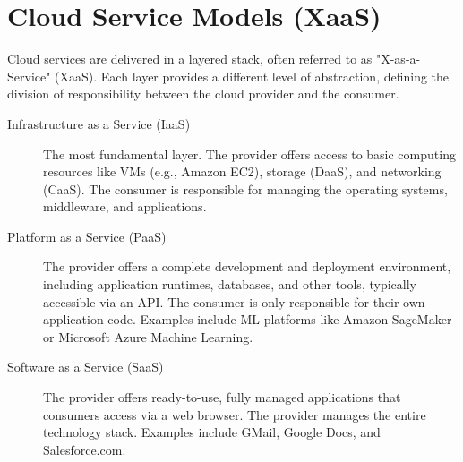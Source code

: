 \section{Cloud Service Models (XaaS)}
Cloud services are delivered in a layered stack, often referred to as "X-as-a-Service" (XaaS). Each layer provides a different level of abstraction, defining the division of responsibility between the cloud provider and the consumer.


\begin{description}
    \item[Infrastructure as a Service (IaaS)] The most fundamental layer. The provider offers access to basic computing resources like VMs (e.g., Amazon EC2), storage (DaaS), and networking (CaaS). The consumer is responsible for managing the operating systems, middleware, and applications.
    \item[Platform as a Service (PaaS)] The provider offers a complete development and deployment environment, including application runtimes, databases, and other tools, typically accessible via an API. The consumer is only responsible for their own application code. Examples include ML platforms like Amazon SageMaker or Microsoft Azure Machine Learning.
    \item[Software as a Service (SaaS)] The provider offers ready-to-use, fully managed applications that consumers access via a web browser. The provider manages the entire technology stack. Examples include GMail, Google Docs, and Salesforce.com.
\end{description}

